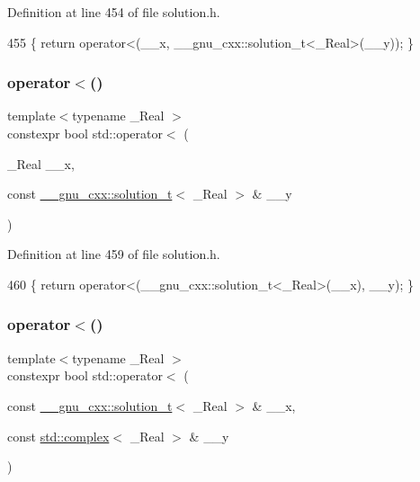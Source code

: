 Definition at line 454 of file solution.\+h.


\begin{DoxyCode}
455     \{ \textcolor{keywordflow}{return} operator<(\_\_x, \_\_gnu\_cxx::solution\_t<\_Real>(\_\_y)); \}
\end{DoxyCode}
\mbox{\label{namespacestd_a183c95d9119b28c67d257989db658fdb}} 
\subsubsection{\texorpdfstring{operator$<$()}{operator<()}\hspace{0.1cm}{\footnotesize\ttfamily [3/5]}}
{\footnotesize\ttfamily template$<$typename \+\_\+\+Real $>$ \\
constexpr bool std\+::operator$<$ (\begin{DoxyParamCaption}\item[{\+\_\+\+Real}]{\+\_\+\+\_\+x,  }\item[{const \hyperlink{namespace____gnu__cxx_ae20ea642de50eb361074c62676b0159c}{\+\_\+\+\_\+gnu\+\_\+cxx\+::solution\+\_\+t}$<$ \+\_\+\+Real $>$ \&}]{\+\_\+\+\_\+y }\end{DoxyParamCaption})}



Definition at line 459 of file solution.\+h.


\begin{DoxyCode}
460     \{ \textcolor{keywordflow}{return} operator<(\_\_gnu\_cxx::solution\_t<\_Real>(\_\_x), \_\_y); \}
\end{DoxyCode}
\mbox{\label{namespacestd_a4586465c3d71c8a977bb56c06c604eab}} 
\subsubsection{\texorpdfstring{operator$<$()}{operator<()}\hspace{0.1cm}{\footnotesize\ttfamily [4/5]}}
{\footnotesize\ttfamily template$<$typename \+\_\+\+Real $>$ \\
constexpr bool std\+::operator$<$ (\begin{DoxyParamCaption}\item[{const \hyperlink{namespace____gnu__cxx_ae20ea642de50eb361074c62676b0159c}{\+\_\+\+\_\+gnu\+\_\+cxx\+::solution\+\_\+t}$<$ \+\_\+\+Real $>$ \&}]{\+\_\+\+\_\+x,  }\item[{const \hyperlink{classstd_1_1complex}{std\+::complex}$<$ \+\_\+\+Real $>$ \&}]{\+\_\+\+\_\+y }\end{DoxyParamCaption})}



